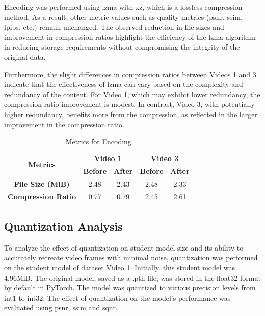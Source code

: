     Encoding was performed using \gls{lzma} with xz, which is a lossless compression method. As a result, other metric values such as quality metrics (\gls{psnr}, \gls{ssim}, \gls{lpips}, etc.) remain unchanged. The observed reduction in file sizes and improvement in compression ratios highlight the efficiency of the \gls{lzma} algorithm in reducing storage requirements without compromising the integrity of the original data.
    
    Furthermore, the slight differences in compression ratios between Videos 1 and 3 indicate that the effectiveness of \gls{lzma} can vary based on the complexity and redundancy of the content. For Video 1, which may exhibit lower redundancy, the compression ratio improvement is modest. In contrast, Video 3, with potentially higher redundancy, benefits more from the compression, as reflected in the larger improvement in the compression ratio.

    \begin{table}[H]
        \centering
        \caption{Metrics for Encoding}
        \label{tab:encoding-result}
        \begin{tabular}{|c|c|c|c|c|}
            \hline
            \multirow{2}{*}{\textbf{Metrics}} & \multicolumn{2}{c|}{\textbf{Video 1}} & \multicolumn{2}{c|}{\textbf{Video 3}} \\ \cline{2-5}
            & \textbf{Before} & \textbf{After} & \textbf{Before} & \textbf{After} \\ \hline
            \textbf{File Size (MiB)} & 2.48 & 2.43 & 2.48 & 2.33 \\ \hline
            \textbf{Compression Ratio} & 0.77 & 0.79 & 2.45 & 2.61 \\ \hline
        \end{tabular}
    \end{table}
    

    \subsection{Quantization Analysis}
    To analyze the effect of quantization on student model size and its ability to accurately recreate video frames with minimal noise, quantization was performed on the student model of dataset Video 1. Initially, this student model was 4.96MiB. The original model, saved as a .pth file, was stored in the float32 format by default in PyTorch. The model was quantized to various precision levels from int1 to int32. The effect of quantization on the model's performance was evaluated using \gls{psnr}, \gls{ssim} and \gls{sqnr}.

